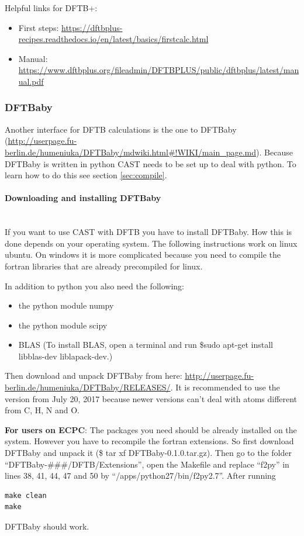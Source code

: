 \documentclass[10pt,a4paper]{article} %
\begin{document}
Helpful links for DFTB+:
\begin{itemize}
\item First steps: \url{https://dftbplus-recipes.readthedocs.io/en/latest/basics/firstcalc.html}
\item Manual: \url{https://www.dftbplus.org/fileadmin/DFTBPLUS/public/dftbplus/latest/manual.pdf}
\end{itemize}


\subsubsection{DFTBaby} \label{sec:DFTB}

Another interface for DFTB calculations is the one to DFTBaby (\url{http://userpage.fu-berlin.de/humeniuka/DFTBaby/mdwiki.html#!WIKI/main_page.md}). Because DFTBaby is written in python CAST needs to be set up to deal with python. To learn how to do this see section \ref{sec:compile}.


\paragraph{Downloading and installing DFTBaby}\mbox{}\\

If you want to use CAST with DFTB you have to install DFTBaby. How this is done depends on your operating system. The following instructions work on linux ubuntu. On windows it is more complicated because you need to compile the fortran libraries that are already precompiled for linux.

In addition to python you also need the following:
\begin{itemize}
\item the python module numpy
\item the python module scipy
\item BLAS (To install BLAS, open a terminal and run \$sudo apt-get install libblas-dev liblapack-dev.)
\end{itemize}

Then download and unpack DFTBaby from here: \url{http://userpage.fu-berlin.de/humeniuka/DFTBaby/RELEASES/}. It is recommended to use the version from July 20, 2017 because newer versions can't deal with atoms different from C, H, N and O.

\textbf{For users on ECPC}: The packages you need should be already installed on the system. However you have to recompile the fortran extensions. So first download DFTBaby and unpack it (\$ tar xf DFTBaby-0.1.0.tar.gz). Then go to the folder ``DFTBaby-\#\#\#/DFTB/Extensions'', open the Makefile and replace ``f2py'' in lines 38, 41, 44, 47 and 50 by ``/apps/python27/bin/f2py2.7''. After running
\begin{lstlisting}
make clean
make
\end{lstlisting}
DFTBaby should work.
\end{document}
